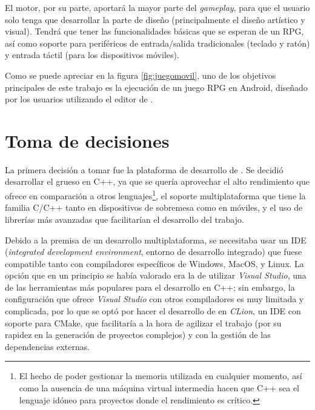 \medskip

El motor, por su parte, aportará la mayor parte del \textit{gameplay}, para que el usuario solo tenga que desarrollar la parte de diseño (principalmente el diseño artístico y visual). Tendrá que tener las funcionalidades básicas que se esperan de un RPG, así como soporte para periféricos de entrada/salida tradicionales (teclado y ratón) y entrada táctil (para los dispositivos móviles).

\medskip

Como se puede apreciar en la figura \ref{fig:juegomovil}, uno de los objetivos principales de este trabajo es la ejecución de un juego RPG en Android, diseñado por los usuarios utilizando el editor de \baker. 


\section{Toma de decisiones}
\label{sec:decisiones}
La primera decisión a tomar fue la plataforma de desarrollo de \baker. Se decidió desarrollar el grueso en C++, ya que se quería aprovechar el alto rendimiento que ofrece en comparación a otros lenguajes\footnote{El hecho de poder gestionar la memoria utilizada en cualquier momento, así como la ausencia de una máquina virtual intermedia hacen que C++ sea el lenguaje idóneo para proyectos donde el rendimiento es crítico.}, el soporte multiplataforma que tiene la familia C/C++ tanto en dispositivos de sobremesa como en móviles, y el uso de librerías más avanzadas que facilitarían el desarrollo del trabajo.

\medskip

Debido a la premisa de un desarrollo multiplataforma, se necesitaba usar un IDE (\textit{integrated development environment}, entorno de desarrollo integrado) que fuese compatible tanto con compiladores específicos de Windows, MacOS, y Linux. La opción que en un principio se había valorado era la de utilizar \textit{Visual Studio}, una de las herramientas más populares para el desarrollo en C++; sin embargo, la configuración que ofrece \textit{Visual Studio} con otros compiladores es muy limitada y complicada, por lo que se optó por hacer el desarrollo de \baker{} en \textit{CLion}, un IDE con soporte para CMake, que facilitaría a la hora de agilizar el trabajo (por su rapidez en la generación de proyectos complejos) y con la gestión de las dependencias externas.

